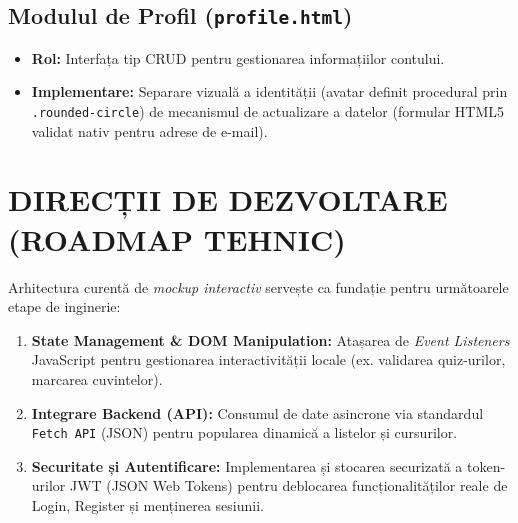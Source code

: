 \documentclass[11pt, a4paper]{article}
\begin{document}
\subsection{Modulul de Profil (\texttt{profile.html})}
\begin{itemize}[label={}]
    \item \textbf{Rol:} Interfața tip CRUD pentru gestionarea informațiilor contului.
    \item \textbf{Implementare:} Separare vizuală a identității (avatar definit procedural prin \texttt{.rounded-circle}) de mecanismul de actualizare a datelor (formular HTML5 validat nativ pentru adrese de e-mail).
\end{itemize}

\section{DIRECȚII DE DEZVOLTARE (ROADMAP TEHNIC)}
Arhitectura curentă de \textit{mockup interactiv} servește ca fundație pentru următoarele etape de inginerie:

\begin{enumerate}
    \item \textbf{State Management \& DOM Manipulation:} Atașarea de \textit{Event Listeners} JavaScript pentru gestionarea interactivității locale (ex. validarea quiz-urilor, marcarea cuvintelor).
    \item \textbf{Integrare Backend (API):} Consumul de date asincrone via standardul \texttt{Fetch API} (JSON) pentru popularea dinamică a listelor și cursurilor.
    \item \textbf{Securitate și Autentificare:} Implementarea și stocarea securizată a token-urilor JWT (JSON Web Tokens) pentru deblocarea funcționalităților reale de Login, Register și menținerea sesiunii.
\end{enumerate}
\end{document}

